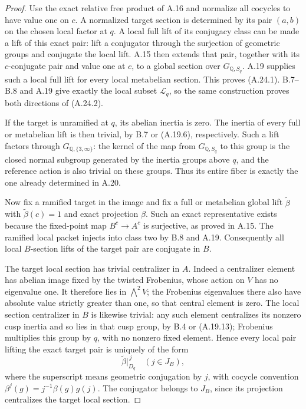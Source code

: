 \begin{proof}
Use the exact relative free product of A.16 and normalize
all cocycles to have value one on $c$. A normalized target
section is determined by its pair $(a,b)$ on the chosen
local factor at $q$. A local full lift of its conjugacy
class can be made a lift of this exact pair: lift a
conjugator through the surjection of geometric groups and
conjugate the local lift. A.15 then extends that pair,
together with its $c$-conjugate pair and value one at $c$,
to a global section over $G_{\mathbb Q,S_q}$.
A.19 supplies such a local full lift for every local
metabelian section. This proves (A.24.1). B.7--B.8 and
A.19 give exactly the local subset $\mathscr L_q$, so
the same construction proves both directions of
(A.24.2).

If the target is unramified at $q$, its abelian inertia
is zero. The inertia of every full or metabelian lift is
then trivial, by B.7 or (A.19.6), respectively. Such a
lift factors through $G_{\mathbb Q,\{3,\infty\}}$:
the kernel of the map from $G_{\mathbb Q,S_q}$ to this
group is the closed normal subgroup generated by the
inertia groups above $q$, and the reference action is
also trivial on these groups. Thus its entire fiber is
exactly the one already determined in A.20.

Now fix a ramified target in the image and fix a full or
metabelian global lift $\widetilde\beta$ with
$\widetilde\beta(c)=1$ and exact projection $\beta$.
Such an exact representative exists because the
fixed-point map $B^c\to A^c$ is surjective, as proved in
A.15. The ramified local packet injects into class two
by B.8 and A.19. Consequently all local $B$-section
lifts of the target pair are conjugate in $B$.

The target local section has trivial centralizer in $A$.
Indeed a centralizer element has abelian image fixed by
the twisted Frobenius, whose action on $V$ has no
eigenvalue one. It therefore lies in $\bigwedge^2V$;
the Frobenius eigenvalues there also have absolute value
strictly greater than one, so that central element is
zero. The local section centralizer in $B$ is likewise
trivial: any such element centralizes its nonzero cusp
inertia and so lies in that cusp group, by B.4 or
(A.19.13); Frobenius multiplies this group by $q$, with
no nonzero fixed element. Hence every local pair lifting
the exact target pair is uniquely of the form
\[
       \widetilde\beta|_{D_q}^{\,j}\quad(j\in J_B),
\]
where the superscript means geometric conjugation by
$j$, with cocycle convention
$\beta^j(g)=j^{-1}\beta(g)g(j)$.
The conjugator belongs to $J_B$, since its projection
centralizes the target local section.


\end{proof}
